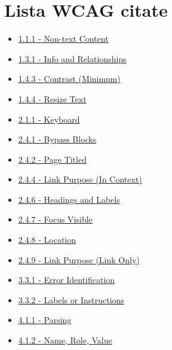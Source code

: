 \section{Lista WCAG citate}
\begin{itemize}
    \item \label{wcag:1.1.1} \href{https://www.w3.org/TR/WCAG21/#non-text-content}{1.1.1 - Non-text Content}
    \item \label{wcag:1.3.1} \href{https://www.w3.org/TR/WCAG21/#info-and-relationships}{1.3.1 - Info and Relationships}
    \item \label{wcag:1.4.3} \href{https://www.w3.org/TR/WCAG21/#contrast-minimum}{1.4.3 - Contrast (Minimum)}
    \item \label{wcag:1.4.4} \href{https://www.w3.org/TR/WCAG21/#resize-text}{1.4.4 - Resize Text}
    \item \label{wcag:2.1.1} \href{https://www.w3.org/TR/WCAG21/#keyboard}{2.1.1 - Keyboard}
    \item \label{wcag:2.4.1} \href{https://www.w3.org/TR/WCAG21/#bypass-blocks}{2.4.1 - Bypass Blocks}
    \item \label{wcag:2.4.2} \href{https://www.w3.org/TR/WCAG21/#page-titled}{2.4.2 - Page Titled}
    \item \label{wcag:2.4.4} \href{https://www.w3.org/TR/WCAG21/#link-purpose-in-context}{2.4.4 - Link Purpose (In Context)}
    \item \label{wcag:2.4.6} \href{https://www.w3.org/TR/WCAG21/#headings-and-labels}{2.4.6 - Headings and Labels}
    \item \label{wcag:2.4.7} \href{https://www.w3.org/TR/WCAG21/#focus-visible}{2.4.7 - Focus Visible}
    \item \label{wcag:2.4.8} \href{https://www.w3.org/TR/WCAG21/#location}{2.4.8 - Location}
    \item \label{wcag:2.4.9} \href{https://www.w3.org/TR/WCAG21/#link-purpose-link-only}{2.4.9 - Link Purpose (Link Only)}
    \item \label{wcag:3.3.1} \href{https://www.w3.org/TR/WCAG21/#error-identification}{3.3.1 - Error Identification}
    \item \label{wcag:3.3.2} \href{https://www.w3.org/TR/WCAG21/#labels-or-instructions}{3.3.2 - Labels or Instructions}
    \item \label{wcag:4.1.1} \href{https://www.w3.org/TR/WCAG21/#parsing}{4.1.1 - Parsing}
    \item \label{wcag:4.1.2} \href{https://www.w3.org/TR/WCAG21/#name-role-value}{4.1.2 - Name, Role, Value}
\end{itemize}



